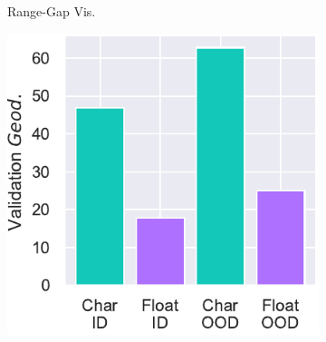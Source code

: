 \begin{figure}
\centering
\begin{subfigure}{.46\linewidth}
\centering
{}
\caption{Range-Gap Vis.}\label{fig:so3_range}
\end{subfigure}
\hfill
\begin{subfigure}{.5\linewidth}
\centering
\includegraphics[width=\linewidth]{figures/airplane/so3/bar.pdf}

\end{subfigure}
\end{figure}
